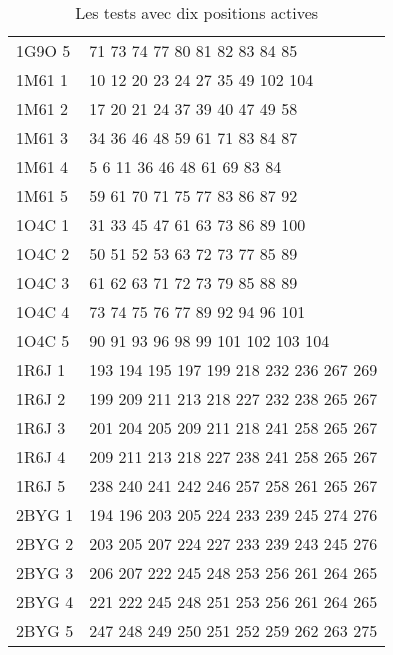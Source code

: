 \begin{table}[!htbp]
\begin{tabular}{ll}
        1G9O 5 & 71 73 74 77 80 81 82 83 84 85 \\
        1M61 1 & 10 12 20 23 24 27 35 49 102 104 \\
        1M61 2 & 17 20 21 24 37 39 40 47 49 58 \\
        1M61 3 & 34 36 46 48 59 61 71 83 84 87 \\
        1M61 4 & 5 6 11 36 46 48 61 69 83 84 \\
        1M61 5 & 59 61 70 71 75 77 83 86 87 92 \\
        1O4C 1 & 31 33 45 47 61 63 73 86 89 100 \\
        1O4C 2 & 50 51 52 53 63 72 73 77 85 89 \\
        1O4C 3 & 61 62 63 71 72 73 79 85 88 89 \\
        1O4C 4 & 73 74 75 76 77 89 92 94 96 101 \\
        1O4C 5 & 90 91 93 96 98 99 101 102 103 104 \\
        1R6J 1 & 193 194 195 197 199 218 232 236 267 269 \\
        1R6J 2 & 199 209 211 213 218 227 232 238 265 267 \\
        1R6J 3 & 201 204 205 209 211 218 241 258 265 267 \\
        1R6J 4 & 209 211 213 218 227 238 241 258 265 267 \\
        1R6J 5 & 238 240 241 242 246 257 258 261 265 267 \\
        2BYG 1 & 194 196 203 205 224 233 239 245 274 276 \\
        2BYG 2 & 203 205 207 224 227 233 239 243 245 276 \\
        2BYG 3 & 206 207 222 245 248 253 256 261 264 265 \\
        2BYG 4 & 221 222 245 248 251 253 256 261 264 265 \\
        2BYG 5 & 247 248 249 250 251 252 259 262 263 275 \\

        \bottomrule

      \end{tabular}      
      \caption{Les tests avec dix positions actives}
\label{tab:test10}      
    \end{table}


